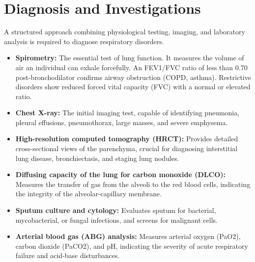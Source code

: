 \section*{Diagnosis and Investigations}
A structured approach combining physiological testing, imaging, and laboratory analysis is required to diagnose respiratory disorders.
\begin{itemize}
    \item \textbf{Spirometry:} The essential test of lung function. It measures the volume of air an individual can exhale forcefully. An FEV1/FVC ratio of less than 0.70 post-bronchodilator confirms airway obstruction (COPD, asthma). Restrictive disorders show reduced forced vital capacity (FVC) with a normal or elevated ratio.
    \item \textbf{Chest X-ray:} The initial imaging test, capable of identifying pneumonia, pleural effusions, pneumothorax, large masses, and severe emphysema.
    \item \textbf{High-resolution computed tomography (HRCT):} Provides detailed cross-sectional views of the parenchyma, crucial for diagnosing interstitial lung disease, bronchiectasis, and staging lung nodules.
    \item \textbf{Diffusing capacity of the lung for carbon monoxide (DLCO):} Measures the transfer of gas from the alveoli to the red blood cells, indicating the integrity of the alveolar-capillary membrane.
    \item \textbf{Sputum culture and cytology:} Evaluates sputum for bacterial, mycobacterial, or fungal infections, and screens for malignant cells.
    \item \textbf{Arterial blood gas (ABG) analysis:} Measures arterial oxygen (PaO2), carbon dioxide (PaCO2), and pH, indicating the severity of acute respiratory failure and acid-base disturbances.
\end{itemize}

